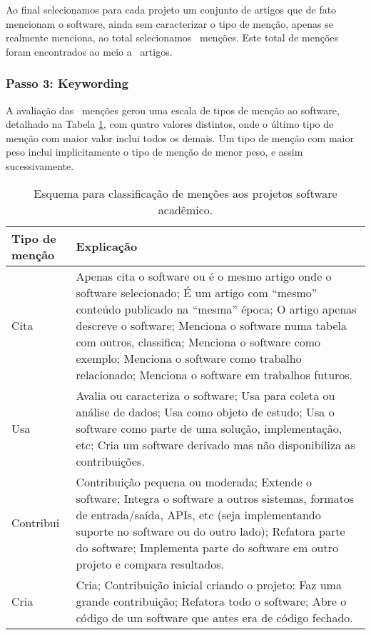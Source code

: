 Ao final selecionamos para cada projeto um conjunto de artigos que de fato
mencionam o software, ainda sem caracterizar o tipo de menção, apenas se
realmente menciona, ao total selecionamos \ScreeningCount \ menções.
Este total de menções foram encontrados ao meio a \ScreeningUniqueCount \ artigos.


\subsubsection{Passo 3: Keywording}

A avaliação das \ScreeningCount \ menções gerou uma escala de tipos de menção
ao software, detalhado na Tabela \ref{esquema-de-mencao}, com quatro valores
distintos, onde o último tipo de menção com maior valor inclui todos os demais.
Um tipo de menção com maior peso inclui implicitamente o tipo de menção de
menor peso, e assim sucessivamente.

\begin{table}[h]
\caption{Esquema para classificação de menções aos projetos software acadêmico.}
\centering
\begin{tabular}{ l p{10cm} }
  \hline
  Tipo de menção           & Explicação \\
  \hline
  Cita      & Apenas cita o software ou é o mesmo artigo onde o software selecionado; É um artigo com ``mesmo'' conteúdo publicado na ``mesma'' época; O artigo apenas descreve o software; Menciona o software numa tabela com outros, classifica; Menciona o software como exemplo; Menciona o software como trabalho relacionado; Menciona o software em trabalhos futuros. \\
  Usa       & Avalia ou caracteriza o software; Usa para coleta ou análise de dados; Usa como objeto de estudo; Usa o software como parte de uma solução, implementação, etc; Cria um software derivado mas não disponibiliza as contribuições. \\
  Contribui & Contribuição pequena ou moderada; Extende o software; Integra o software a outros sistemas, formatos de entrada/saída, APIs, etc (seja implementando suporte no software ou do outro lado); Refatora parte do software; Implementa parte do software em outro projeto e compara resultados. \\
  Cria      & Cria; Contribuição inicial criando o projeto; Faz uma grande contribuição; Refatora todo o software; Abre o código de um software que antes era de código fechado. \\
  \hline
\end{tabular}
\label{esquema-de-mencao}
\end{table}

